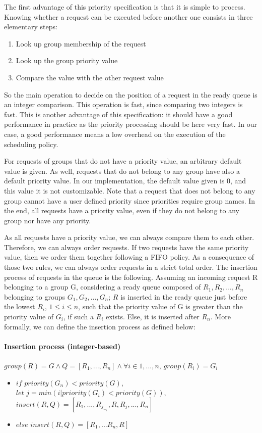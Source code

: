 \documentclass[11pt]{report}
\begin{document}
The first advantage of this priority specification is that it is simple  to process. Knowing whether a request can be executed before another one consists in three elementary steps:

\begin{enumerate}
\item Look up group membership of the request
\item Look up the group priority value
\item Compare the value with the other request value
\end{enumerate}

So the main operation to decide on the position of a request in the ready queue is an integer comparison. This operation is fast, since comparing two integers is fast. This is another advantage of this specification: it should have a good performance in practice as the priority processing should be here very fast. In our case, a good performance means a low overhead on the execution of the scheduling policy.

For requests of groups that do not have a priority value, an arbitrary default value is given. As well, requests that do not belong to any group have also a default priority value. In our implementation, the default value given is 0, and this value it is not customizable. 
Note that a request that does not belong to any group cannot have a user defined priority since priorities require group names. In the end, all requests have a priority value, even if they do not belong to any group nor have any priority. 


As all requests have a priority value, we can always compare them to each other. Therefore, we can always order requests. If two requests have the same priority value, then we order them together following a FIFO policy. As a consequence of those two rules, we can always order requests in a strict total order.
The insertion process of requests in the queue is the following. Assuming an incoming request R belonging to a group G, considering a ready queue composed of $R_1,R_2,...,R_n$ belonging to groups $G_1,G_2,...,G_n$; $R$ is  inserted in the ready queue just before the lowest $R_i$, $1 \le i \le n$, such that the priority value of G is greater than the priority value of $G_i$, if such a $R_i$ exists. Else, it is inserted after $R_n$.
More formally, we can define the insertion process as defined below:
\paragraph{Insertion process (integer-based)}
$group(R)=G \wedge Q=[R_1,...,R_n] \wedge \forall i \in 1,...,n$, $group(R_i)=G_i$
\begin{itemize}
\item $if$ $priority(G_n) < priority(G)$,\\$let$ $j=min({i| priority(G_i) < priority(G)})$, $insert(R, Q)=[R_1,...,R_j_-_1,R,R_j,...,R_n]$
\item $else$ $insert(R,Q)=[R_1,...R_n,R]$
\end{itemize}
\end{document}

